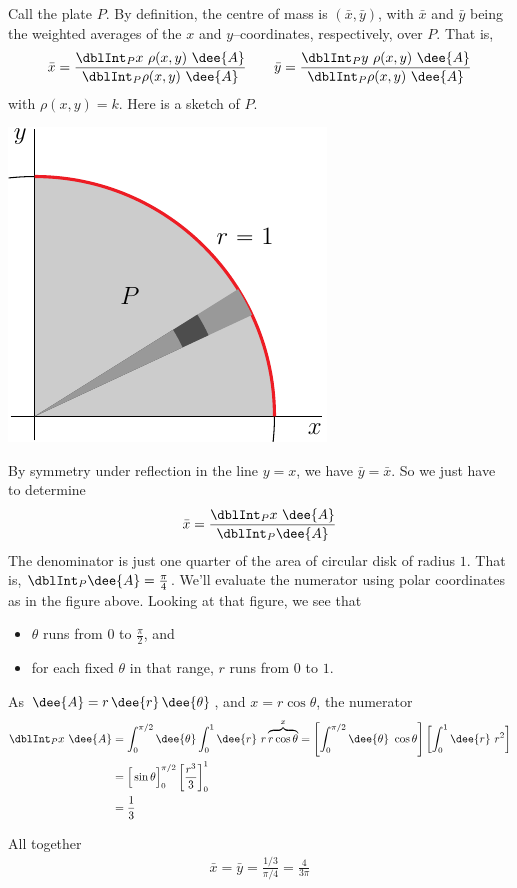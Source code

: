 \begin{solution}
 Call the plate $P$. 
By definition, the centre of mass is $(\bar x, \bar y)$,
with $\bar x$ and $\bar y$ being the weighted averages  of the $x$ and 
$y$--coordinates, respectively, over $P$. That is,
\begin{align*}
\bar x = \frac{\dblInt_P x\ \rho(x,y)\ \dee{A}}{\dblInt_P \rho(x,y)\ \dee{A}}
\qquad
\bar y = \frac{\dblInt_P y\ \rho(x,y)\ \dee{A}}{\dblInt_P \rho(x,y)\ \dee{A}}
\end{align*}
with $\rho(x,y)=k$.
Here is a sketch of $P$.
\begin{center}
     \includegraphics{fig/OE10A_7.pdf}
\end{center}
By symmetry under reflection in the line $y=x$, we have $\bar y=\bar x$.
So we just have to determine 
\begin{equation*}
\bar x = \frac{\dblInt_P x\ \dee{A}}{\dblInt_P  \dee{A}}
\end{equation*}
The denominator is just one quarter of the area of circular disk of radius $1$.
That is, $\dblInt_P  \dee{A}=\frac{\pi}{4}$.
We'll evaluate the numerator using polar coordinates as in the figure above.
Looking at that figure, we see that
\begin{itemize}
\item 
$\theta$ runs from $0$ to $\frac{\pi}{2}$, and
\item
for each fixed $\theta$ in that range, $r$ runs from $0$ to $1$.
\end{itemize}
As $\dee{A}=r\,\dee{r}\,\dee{\theta}$, and $x=r\cos\theta$, the numerator
\begin{align*}
\dblInt_P x\ \dee{A}
&=\int_0^{\pi/2}\dee{\theta} \int_0^1\dee{r}\ r\overbrace{r\cos\theta}^{x}
=\left[\int_0^{\pi/2}\dee{\theta}\ \cos\theta\right]
 \left[ \int_0^1\dee{r}\ r^2\right] \\
&=\Big[\sin\theta\Big]_0^{\pi/2} \left[\frac{r^3}{3}\right]_0^1 \\
&=\frac{1}{3}
\end{align*}

All together
\begin{align*}
\bar x = \bar y = \frac{1/3}{\pi/4} =\frac{4}{3\pi}
\end{align*}
\end{solution}

